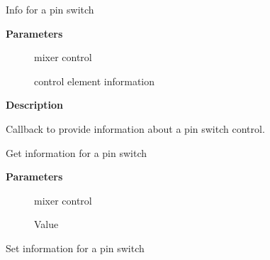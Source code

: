 \documentclass[a4paper,8pt,english]{sphinxmanual}
\begin{document}
\begin{fulllineitems}
\label{sound/kernel-api/alsa-driver-api:c.snd_soc_dapm_info_pin_switch}
Info for a pin switch

\end{fulllineitems}


\textbf{Parameters}
\begin{description}
\item[{}] \leavevmode
mixer control

\item[{}] \leavevmode
control element information

\end{description}

\textbf{Description}

Callback to provide information about a pin switch control.

\begin{fulllineitems}
\label{sound/kernel-api/alsa-driver-api:c.snd_soc_dapm_get_pin_switch}
Get information for a pin switch

\end{fulllineitems}


\textbf{Parameters}
\begin{description}
\item[{}] \leavevmode
mixer control

\item[{}] \leavevmode
Value

\end{description}

\begin{fulllineitems}
\label{sound/kernel-api/alsa-driver-api:c.snd_soc_dapm_put_pin_switch}
Set information for a pin switch

\end{fulllineitems}
\end{document}
